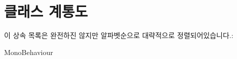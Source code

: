 \section{클래스 계통도}
이 상속 목록은 완전하진 않지만 알파벳순으로 대략적으로 정렬되어있습니다.\+:\begin{DoxyCompactList}
\item Mono\+Behaviour\begin{DoxyCompactList}
\item {}
\item {}
\end{DoxyCompactList}
\end{DoxyCompactList}
